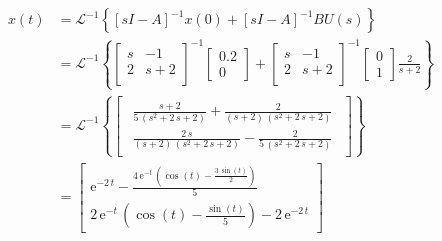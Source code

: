\documentclass{article}
\begin{document}
\begin{eqnarray*}
\begin{split}
x(t) &= \mathcal{L}^{-1} \left\lbrace \left[sI-A \right]^{-1}x(0) + \left[sI-A \right]^{-1}BU(s) \right\rbrace \\
&= \mathcal{L}^{-1} \left\lbrace  
\begin{bmatrix} 
    s  &   -1 \\
    2  &  s+2\\
\end{bmatrix} ^{-1}
\begin{bmatrix}
0.2 \\ 0
\end{bmatrix} + 
\begin{bmatrix} 
    s  &   -1 \\
    2  &  s+2\\
\end{bmatrix} ^{-1}
\begin{bmatrix} 
0 \\ 1
\end{bmatrix} \frac{2}{s+2} \right\rbrace \\
&= \mathcal{L}^{-1} \left\lbrace 
\begin{bmatrix}
\begin{array}{c} \frac{s+2}{5\,\left(s^2+2\,s+2\right)}+\frac{2}{\left(s+2\right)\,\left(s^2+2\,s+2\right)}\\ \frac{2\,s}{\left(s+2\right)\,\left(s^2+2\,s+2\right)}-\frac{2}{5\,\left(s^2+2\,s+2\right)} \end{array}
\end{bmatrix}
 \right\rbrace \\
&= 
\begin{bmatrix}
{\mathrm{e}}^{-2\,t}-\frac{4\,{\mathrm{e}}^{-t}\,\left(\cos\left(t\right)-\frac{3\,\sin\left(t\right)}{2}\right)}{5}\\ 2\,{\mathrm{e}}^{-t}\,\left(\cos\left(t\right)-\frac{\sin\left(t\right)}{5}\right)-2\,{\mathrm{e}}^{-2\,t}
\end{bmatrix}
\end{split}
\end{eqnarray*}
\end{document}
